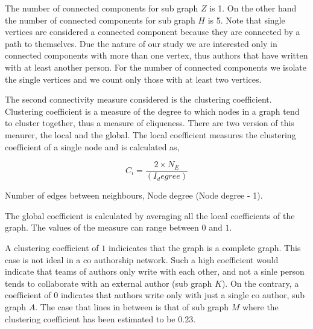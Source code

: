 \documentclass{article}
\begin{document}
The number of connected components for sub graph \(Z\) is 1. On the other
hand the number of connected components for sub graph \(H\) is 5. Note that single
vertices are considered a connected component because they are connected by a path
to themselves. Due the nature of our study we are interested only in connected components
with more than one vertex, thus authors that have written with at least another
person. For the number of connected components we isolate the single vertices
and we count only those with at least two vertices.

The second connectivity measure considered is the clustering coefficient. Clustering
coefficient is a measure of the degree to which nodes in a graph tend to
cluster together, thus a measure of cliqueness. There are two version of this
meaurer, the local and the global. The local coefficient measures the clustering
coefficient of a single node and is calculated as,

\[C_i = \frac{2 \times N_E}{(I_degree)}\]

Number of edges between neighbours, Node degree (Node degree - 1).

The global coefficient is calculated by averaging all the local coefficients of
the graph. The values of the measure can range between \(0\) and \(1\). 

A clustering coefficient of \(1\) indicicates that the graph is a complete graph.
This case is not ideal in a co authorship network. Such a high coefficient would
indicate that teams of authors only write with each other, and not a sinle person
tends to collaborate with an external author (sub graph \(K\)). On the contrary,
a coefficient of \(0\) indicates
that authors write only with just a single co author, sub graph \(A\).
The case that lines in between is that of sub graph \(M\) where the clustering
coefficient has been estimated to be \(0.23\).
\end{document}
